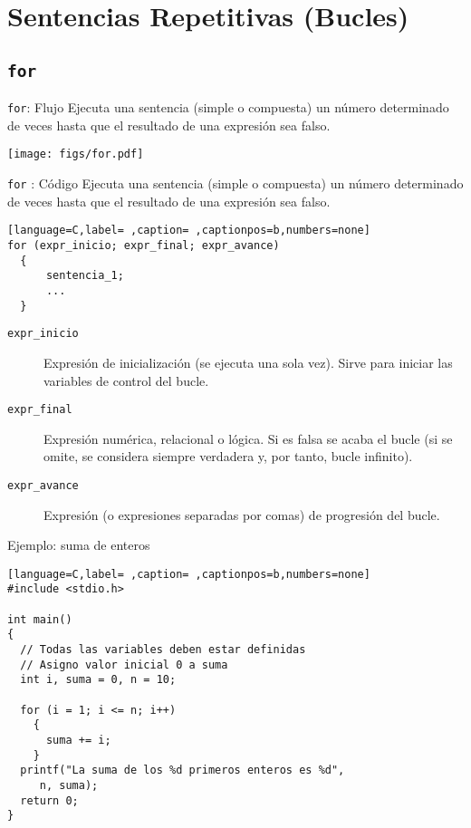 \documentclass[usenames,svgnames,dvipsnames, aspectratio=169]{beamer}
\begin{document}
\section{Sentencias Repetitivas (Bucles)}
\label{sec:orgdec94f7}
\subsection{\texttt{for}}
\label{sec:org114826c}

\begin{frame}[label={sec:org4c5f319},fragile]{\texttt{for}: Flujo}
 Ejecuta una sentencia (simple o compuesta) un número determinado de veces hasta que el resultado de una expresión sea falso.

\begin{center}
\texttt{[image: figs/for.pdf]}
\end{center}
\end{frame}

\begin{frame}[label={sec:orgdce0706},fragile]{\texttt{for} : Código}
 Ejecuta una sentencia (simple o compuesta) un número determinado de veces hasta que el resultado de una expresión sea falso.

\begin{lstlisting}[language=C,label= ,caption= ,captionpos=b,numbers=none]
for (expr_inicio; expr_final; expr_avance)
  {
      sentencia_1;
      ...
  }
\end{lstlisting}

\begin{description}
\item[{\texttt{expr\_inicio}}] Expresión de inicialización (se ejecuta una sola vez). Sirve para iniciar las variables de control del bucle.
\item[{\texttt{expr\_final}}] Expresión numérica, relacional o lógica. Si es falsa se acaba el bucle (si se omite, se considera siempre verdadera y, por tanto, bucle infinito).
\item[{\texttt{expr\_avance}}] Expresión (o expresiones separadas por comas) de progresión del bucle.
\end{description}
\end{frame}

\begin{frame}[label={sec:org2f7ac2f},fragile]{Ejemplo: suma de enteros}
 \begin{lstlisting}[language=C,label= ,caption= ,captionpos=b,numbers=none]
#include <stdio.h>

int main()
{
  // Todas las variables deben estar definidas
  // Asigno valor inicial 0 a suma
  int i, suma = 0, n = 10;

  for (i = 1; i <= n; i++)
    {
      suma += i;
    }
  printf("La suma de los %d primeros enteros es %d",
	 n, suma);
  return 0;
}
\end{lstlisting}
\end{frame}
\end{document}
